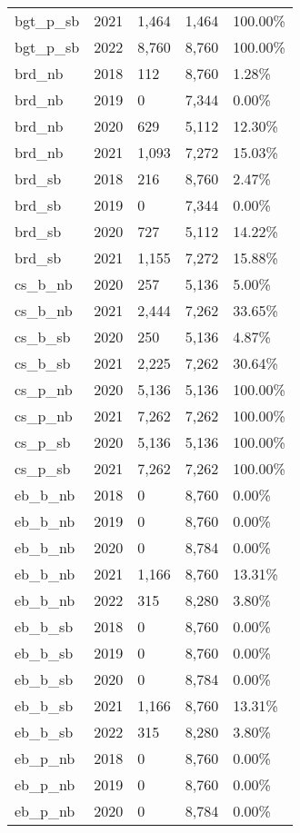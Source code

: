 \documentclass[
  letterpaper,
]{scrbook}
\begin{document}
\begin{longtable}[t]{lrlll}
bgt\_p\_sb & 2021 & 1,464 & 1,464 & 100.00\%\\
bgt\_p\_sb & 2022 & 8,760 & 8,760 & 100.00\%\\
brd\_nb & 2018 & 112 & 8,760 & 1.28\%\\
brd\_nb & 2019 & 0 & 7,344 & 0.00\%\\
\addlinespace
brd\_nb & 2020 & 629 & 5,112 & 12.30\%\\
brd\_nb & 2021 & 1,093 & 7,272 & 15.03\%\\
brd\_sb & 2018 & 216 & 8,760 & 2.47\%\\
brd\_sb & 2019 & 0 & 7,344 & 0.00\%\\
brd\_sb & 2020 & 727 & 5,112 & 14.22\%\\
\addlinespace
brd\_sb & 2021 & 1,155 & 7,272 & 15.88\%\\
cs\_b\_nb & 2020 & 257 & 5,136 & 5.00\%\\
cs\_b\_nb & 2021 & 2,444 & 7,262 & 33.65\%\\
cs\_b\_sb & 2020 & 250 & 5,136 & 4.87\%\\
cs\_b\_sb & 2021 & 2,225 & 7,262 & 30.64\%\\
\addlinespace
cs\_p\_nb & 2020 & 5,136 & 5,136 & 100.00\%\\
cs\_p\_nb & 2021 & 7,262 & 7,262 & 100.00\%\\
cs\_p\_sb & 2020 & 5,136 & 5,136 & 100.00\%\\
cs\_p\_sb & 2021 & 7,262 & 7,262 & 100.00\%\\
eb\_b\_nb & 2018 & 0 & 8,760 & 0.00\%\\
\addlinespace
eb\_b\_nb & 2019 & 0 & 8,760 & 0.00\%\\
eb\_b\_nb & 2020 & 0 & 8,784 & 0.00\%\\
eb\_b\_nb & 2021 & 1,166 & 8,760 & 13.31\%\\
eb\_b\_nb & 2022 & 315 & 8,280 & 3.80\%\\
eb\_b\_sb & 2018 & 0 & 8,760 & 0.00\%\\
\addlinespace
eb\_b\_sb & 2019 & 0 & 8,760 & 0.00\%\\
eb\_b\_sb & 2020 & 0 & 8,784 & 0.00\%\\
eb\_b\_sb & 2021 & 1,166 & 8,760 & 13.31\%\\
eb\_b\_sb & 2022 & 315 & 8,280 & 3.80\%\\
eb\_p\_nb & 2018 & 0 & 8,760 & 0.00\%\\
\addlinespace
eb\_p\_nb & 2019 & 0 & 8,760 & 0.00\%\\
eb\_p\_nb & 2020 & 0 & 8,784 & 0.00\%\\

\end{longtable}
\end{document}
